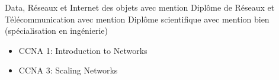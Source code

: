 \documentclass[10.5pt,a4paper,ragged2e,withhyper]{altacv}
\begin{document}
\begin{paracol}{2}
Data, Réseaux et Internet des objets avec mention
\smallbreak
\divider
{}
Diplôme de Réseaux et Télécommunication avec mention
\smallbreak
\divider
{}
Diplôme scientifique avec mention bien (spécialisation en ingénierie)

\begin{itemize}
  \item CCNA 1: Introduction to Networks
  \item CCNA 3: Scaling Networks
\end{itemize}

\end{paracol}
\end{document}
